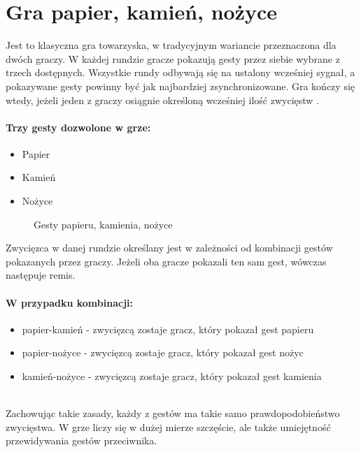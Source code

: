 \documentclass[a4paper,12pt,twoside,openany]{report}
\newcommand{\ImgPath}{.}
\begin{document}
\section{Gra papier, kamień, nożyce}
Jest to klasyczna gra towarzyska, w tradycyjnym wariancie przeznaczona dla dwóch graczy. W każdej rundzie gracze pokazują gesty przez siebie wybrane z trzech dostępnych. Wszystkie rundy odbywają się na ustalony wcześniej sygnał, a pokazywane gesty powinny być jak najbardziej zsynchronizowane. Gra kończy się wtedy, jeżeli jeden z graczy osiągnie określoną wcześniej ilość zwycięstw \cite{Fisher}.


\paragraph{Trzy gesty dozwolone w grze:}
\begin{itemize} 
	\item Papier
	\item Kamień
	\item Nożyce
\end{itemize} 

\begin{figure}[H]
	\centering
	\caption{Gesty papieru, kamienia, nożyce}
\end{figure}

Zwycięzca w danej rundzie określany jest w zależności od kombinacji gestów pokazanych przez graczy. Jeżeli oba gracze pokazali ten sam gest, wówczas następuje remis. 

\paragraph{W przypadku kombinacji:}
\begin{itemize} 
	\item papier-kamień - zwycięzcą zostaje gracz, który pokazał gest papieru
	\item papier-nożyce - zwycięzcą zostaje gracz, który pokazał gest nożyc
	\item kamień-nożyce - zwycięzcą zostaje gracz, który pokazał gest kamienia
\end{itemize} 
\mbox{} \\	
Zachowując takie zasady, każdy z gestów ma takie samo prawdopodobieństwo zwycięstwa. W grze liczy się w dużej mierze szczęście, ale także umiejętność przewidywania gestów przeciwnika.
\end{document}
